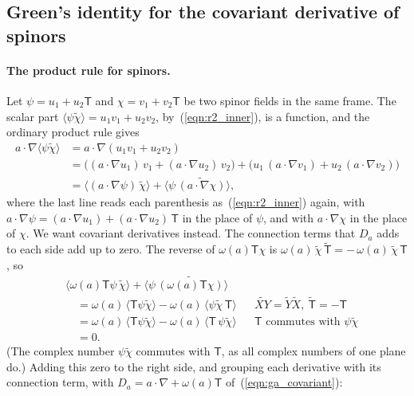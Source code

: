 \subsection{Green's identity for the covariant derivative of spinors}

\paragraph{The product rule for spinors.} Let $\psi = u_1 + u_2\mathsf T$ and $\chi = v_1 + v_2\mathsf T$ be two spinor fields in the same frame. The scalar part $\langle\psi\widetilde\chi\rangle = u_1v_1 + u_2v_2$, by~(\ref{eqn:r2_inner}), is a function, and the ordinary product rule gives
\begin{align*}
a\cdot\nabla\langle\psi\widetilde\chi\rangle &= a\cdot\nabla(u_1v_1 + u_2v_2) \\
&= \big((a\cdot\nabla u_1)\,v_1 + (a\cdot\nabla u_2)\,v_2\big) + \big(u_1\,(a\cdot\nabla v_1) + u_2\,(a\cdot\nabla v_2)\big) \\
&= \big\langle (a\cdot\nabla\psi)\,\widetilde\chi\big\rangle + \big\langle \psi\,\widetilde{(a\cdot\nabla\chi)}\big\rangle ,
\end{align*}
where the last line reads each parenthesis as~(\ref{eqn:r2_inner}) again, with $a\cdot\nabla\psi = (a\cdot\nabla u_1) + (a\cdot\nabla u_2)\,\mathsf T$ in the place of $\psi$, and with $a\cdot\nabla\chi$ in the place of $\chi$. We want covariant derivatives instead. The connection terms that $D_a$ adds to each side add up to zero. The reverse of $\omega(a)\mathsf T\chi$ is $\omega(a)\,\widetilde\chi\,\widetilde{\mathsf T} = -\,\omega(a)\,\widetilde\chi\,\mathsf T$, so
\begin{align*}
&\big\langle \omega(a)\mathsf T\psi\,\widetilde\chi\big\rangle + \big\langle\psi\,\widetilde{(\omega(a)\mathsf T\chi)}\big\rangle \\
&\quad= \omega(a)\,\langle\mathsf T\psi\widetilde\chi\rangle - \omega(a)\,\langle\psi\widetilde\chi\,\mathsf T\rangle && \widetilde{XY} = \widetilde Y\widetilde X,\ \widetilde{\mathsf T} = -\mathsf T \\
&\quad= \omega(a)\,\langle\mathsf T\psi\widetilde\chi\rangle - \omega(a)\,\langle\mathsf T\,\psi\widetilde\chi\rangle && \mathsf T \text{ commutes with } \psi\widetilde\chi \\
&\quad= 0 .
\end{align*}
(The complex number $\psi\widetilde\chi$ commutes with $\mathsf T$, as all complex numbers of one plane do.) Adding this zero to the right side, and grouping each derivative with its connection term, with $D_a = a\cdot\nabla + \omega(a)\mathsf T$ of~(\ref{eqn:ga_covariant}):
